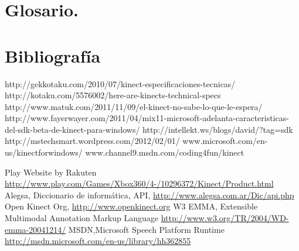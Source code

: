 \documentclass[11pt,a4paper]{article}
\begin{document}
\section{Glosario.}
\printglossary

\section{Bibliografía}
http://gekkotaku.com/2010/07/kinect-especificaciones-tecnicas/
\newline
http://kotaku.com/5576002/here-are-kinects-technical-specs
\newline 
http://www.matuk.com/2011/11/09/el-kinect-no-sabe-lo-que-le-espera/
\newline
http://www.fayerwayer.com/2011/04/mix11-microsoft-adelanta-caracteristicas-del-sdk-beta-de-kinect-para-windows/
\newline
http://intellekt.ws/blogs/david/?tag=sdk
\newline
http://mstechsmart.wordpress.com/2012/02/01/
\newline
www.microsoft.com/en-us/kinectforwindows/
\newline
www.channel9.msdn.com/coding4fun/kinect


\begin{thebibliography}{99}
 Play Website by Rakuten \url{http://www.play.com/Games/Xbox360/4-/10296372/Kinect/Product.html}
 Alegsa, Diccionario de informática, API, \url{http://www.alegsa.com.ar/Dic/api.php}
 Open Kinect Org, \url{http://www.openkinect.org}
 W3 EMMA, Extensible Multimodal Annotation Markup Language \url{http://www.w3.org/TR/2004/WD-emma-20041214/}
 MSDN,Microsoft Speech Platform Runtime \url{http://msdn.microsoft.com/en-us/library/hh362855}
\end{thebibliography}
\end{document}
